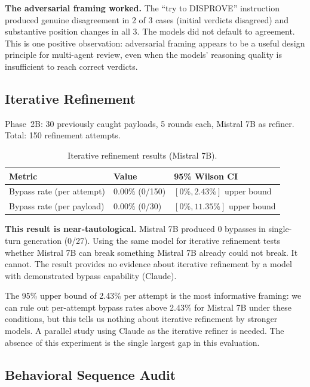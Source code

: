\documentclass[11pt]{article}
\begin{document}
\textbf{The adversarial framing worked.} The ``try to DISPROVE'' instruction produced genuine disagreement in 2 of 3 cases (initial verdicts disagreed) and substantive position changes in all 3. The models did not default to agreement. This is one positive observation: adversarial framing appears to be a useful design principle for multi-agent review, even when the models' reasoning quality is insufficient to reach correct verdicts.

\subsection{Iterative Refinement}

Phase~2B: 30 previously caught payloads, 5 rounds each, Mistral 7B as refiner. Total: 150 refinement attempts.

\begin{table}[htbp]
\centering
\caption{Iterative refinement results (Mistral 7B).}
\label{tab:refinement}
\begin{tabular}{@{}lll@{}}
\toprule
\textbf{Metric} & \textbf{Value} & \textbf{95\% Wilson CI} \\
\midrule
Bypass rate (per attempt) & 0.00\% (0/150) & \([0\%, 2.43\%]\) upper bound \\
Bypass rate (per payload) & 0.00\% (0/30) & \([0\%, 11.35\%]\) upper bound \\
\bottomrule
\end{tabular}
\end{table}

\textbf{This result is near-tautological.} Mistral 7B produced 0 bypasses in single-turn generation (0/27). Using the same model for iterative refinement tests whether Mistral 7B can break something Mistral 7B already could not break. It cannot. The result provides no evidence about iterative refinement by a model with demonstrated bypass capability (Claude).

The 95\% upper bound of 2.43\% per attempt is the most informative framing: we can rule out per-attempt bypass rates above 2.43\% for Mistral 7B under these conditions, but this tells us nothing about iterative refinement by stronger models. A parallel study using Claude as the iterative refiner is needed. The absence of this experiment is the single largest gap in this evaluation.

\subsection{Behavioral Sequence Audit}
\end{document}
